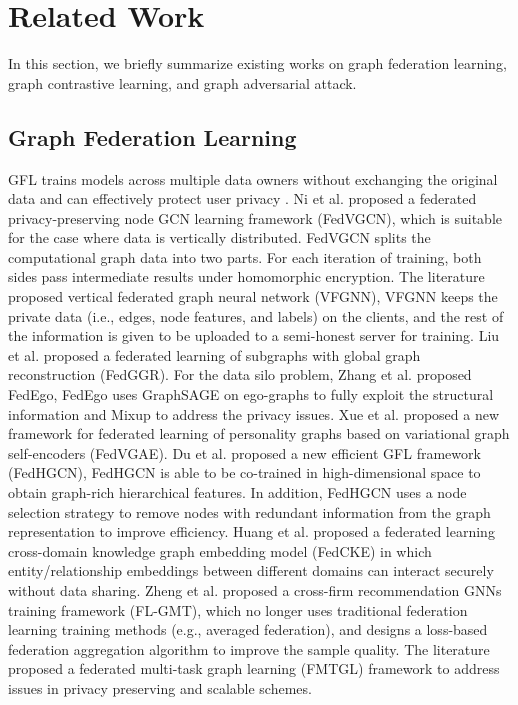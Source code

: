 \section{Related Work}
\label{S2}
In this section, we briefly summarize existing works on graph federation learning, graph contrastive learning, and graph adversarial attack.


\subsection{ Graph Federation Learning}\label{HypergraphLearning}

GFL trains models across multiple data owners without exchanging the original data and can effectively protect user privacy \cite{DBLP:journals/pvldb/LiWZZLW23}. Ni et al. \cite{DBLP:journals/corr/abs-2106-11593} proposed a federated privacy-preserving node GCN learning framework (FedVGCN), which is suitable for the case where data is vertically distributed. FedVGCN splits the computational graph data into two parts. For each iteration of training, both sides pass intermediate results under homomorphic encryption. The literature \cite{DBLP:conf/ijcai/0001ZZWLWWLWZ22} proposed vertical federated graph neural network (VFGNN), VFGNN keeps the private data (i.e., edges, node features, and labels) on the clients, and the rest of the information is given to be uploaded to a semi-honest server for training. Liu et al. \cite{DBLP:conf/apweb/LiuZXSSHDK23} proposed a federated learning of subgraphs with global graph reconstruction (FedGGR).  For the data silo problem, Zhang et al. \cite{DBLP:journals/tkdd/ZhangMCCSZ24} proposed FedEgo, FedEgo uses GraphSAGE on ego-graphs to fully exploit the structural information and Mixup to address the privacy issues. Xue et al. \cite{DBLP:journals/tbd/XueZJT24} proposed a new framework for federated learning of personality graphs based on variational graph self-encoders (FedVGAE). Du et al. \cite{DBLP:journals/kbs/DuLLDH24} proposed a new efficient GFL framework (FedHGCN), FedHGCN is able to be co-trained in high-dimensional space to obtain graph-rich hierarchical features. In addition, FedHGCN uses a node selection strategy to remove nodes with redundant information from the graph representation to improve efficiency.  Huang et al. \cite{DBLP:journals/tbd/HuangLLJWH23} proposed a federated learning cross-domain knowledge graph embedding model (FedCKE) in which entity/relationship embeddings between different domains can interact securely without data sharing. Zheng et al. \cite{DBLP:journals/tii/LiBXJC23} proposed a cross-firm recommendation GNNs training framework (FL-GMT), which no longer uses traditional federation learning training methods (e.g., averaged federation), and designs a loss-based federation aggregation algorithm to improve the sample quality. The literature \cite{DBLP:journals/tist/LiuHZZXC22} proposed a federated multi-task graph learning (FMTGL) framework to address issues in privacy preserving and scalable schemes.

